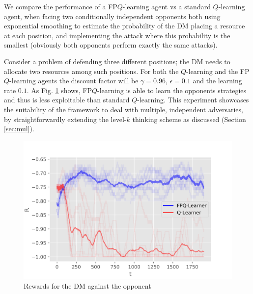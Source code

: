 
We compare the performance of a FP$Q$-learning agent vs a standard $Q$-learning agent, when facing two conditionally independent opponents both using 
exponential smoothing to estimate the probability of the DM placing a resource at each position, and implementing the attack where
this probability is the smallest (obviously both opponents perform exactly the same attacks).

Consider
a problem of defending three different positions; the DM needs to allocate two resources among such positions. For both the $Q$-learning and the FP$Q$-learning agents the discount factor will be $\gamma = 0.96$, $\epsilon = 0.1$ and the learning rate  $0.1$.%
%
As Fig. \ref{fig:2expsmoothers} shows, FP$Q$-learning is able to learn the opponents strategies and thus is less exploitable than standard $Q$-learning.
This experiment showcases the suitability of the framework to deal with multiple, independent adversaries, by straightforwardly extending the level-$k$ thinking scheme as discussed (Section \ref{sec:mul}).
\begin{figure}%
\centering
\includegraphics[scale=0.5]{figures/2expsmoothers.png}%
\caption{Rewards for the DM against the opponent}\label{fig:2expsmoothers}
\end{figure}
%




